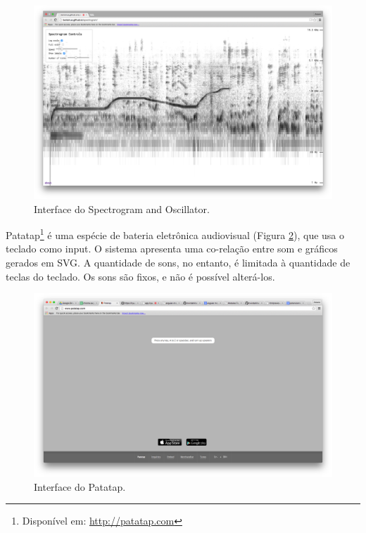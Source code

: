 \begin{figure}
    \caption{\label{spectrogramosc}Interface do Spectrogram and Oscillator.}
    
        \includegraphics[width=1\linewidth]{pictures/cap2/spectrogramandoscilator}
    
\end{figure}

Patatap\footnote{Disponível em: \url{http://patatap.com}} é uma espécie de bateria eletrônica audiovisual (Figura \ref{patatap}), que usa o teclado como input. O sistema apresenta uma co-relação entre som e gráficos gerados em SVG. A quantidade de sons, no entanto, é limitada à quantidade de teclas do teclado. Os sons são fixos, e não é possível alterá-los.

\begin{figure}
    \caption{\label{patatap}Interface do Patatap.}
    
        \includegraphics[width=1\linewidth]{pictures/cap2/patatap}
    
\end{figure}

